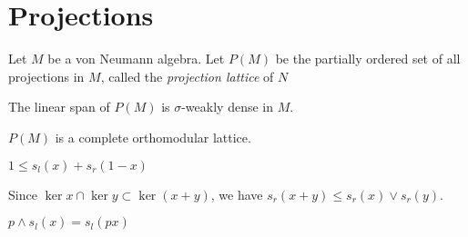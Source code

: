 \documentclass{../../large}
\begin{document}
\section{Projections}


\begin{prb}
Let $M$ be a von Neumann algebra. 
Let $P(M)$ be the partially ordered set of all projections in $M$, called the \emph{projection lattice} of $N$
\begin{parts}
\item The linear span of $P(M)$ is $\sigma$-weakly dense in $M$.
\item $P(M)$ is a complete orthomodular lattice.
\item 
\end{parts}
\end{prb}


$1\le s_l(x)+s_r(1-x)$

Since $\ker x\cap\ker y\subset\ker(x+y)$, we have $s_r(x+y)\le s_r(x)\vee s_r(y)$.

$p\wedge s_l(x)=s_l(px)$
\end{document}
